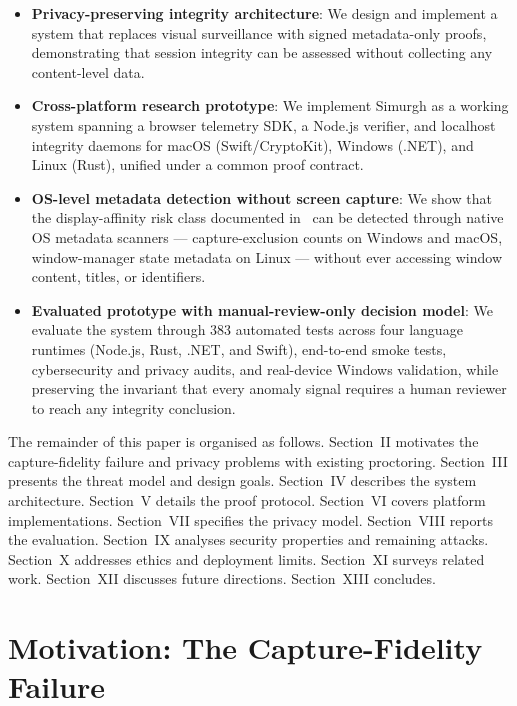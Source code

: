 \documentclass[conference]{IEEEtran}
\begin{document}
\begin{itemize}
\item \textbf{Privacy-preserving integrity architecture}: We design and implement a system that replaces visual surveillance with signed metadata-only proofs, demonstrating that session integrity can be assessed without collecting any content-level data.

\item \textbf{Cross-platform research prototype}: We implement Simurgh as a working system spanning a browser telemetry SDK, a Node.js verifier, and localhost integrity daemons for macOS (Swift/CryptoKit), Windows (.NET), and Linux (Rust), unified under a common proof contract.

\item \textbf{OS-level metadata detection without screen capture}: We show that the display-affinity risk class documented in~\cite{abedini2026invisible} can be detected through native OS metadata scanners — capture-exclusion counts on Windows and macOS, window-manager state metadata on Linux — without ever accessing window content, titles, or identifiers.

\item \textbf{Evaluated prototype with manual-review-only decision model}: We evaluate the system through 383 automated tests across four language runtimes (Node.js, Rust, .NET, and Swift), end-to-end smoke tests, cybersecurity and privacy audits, and real-device Windows validation, while preserving the invariant that every anomaly signal requires a human reviewer to reach any integrity conclusion.
\end{itemize}

The remainder of this paper is organised as follows. Section~II motivates the capture-fidelity failure and privacy problems with existing proctoring. Section~III presents the threat model and design goals. Section~IV describes the system architecture. Section~V details the proof protocol. Section~VI covers platform implementations. Section~VII specifies the privacy model. Section~VIII reports the evaluation. Section~IX analyses security properties and remaining attacks. Section~X addresses ethics and deployment limits. Section~XI surveys related work. Section~XII discusses future directions. Section~XIII concludes.

\section{Motivation: The Capture-Fidelity Failure}
\end{document}
